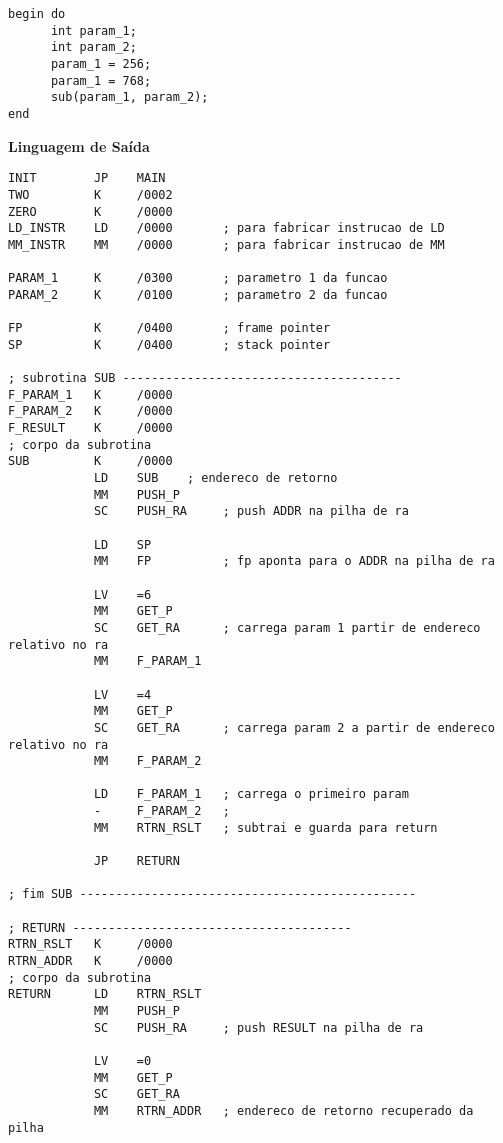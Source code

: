 \begin{lstlisting}
begin do
      int param_1;
      int param_2;
      param_1 = 256;
      param_1 = 768;
      sub(param_1, param_2);
end
\end{lstlisting}

\textbf{Linguagem de Saída}\\ 

\begin{lstlisting}
INIT        JP    MAIN
TWO         K     /0002
ZERO        K     /0000
LD_INSTR    LD    /0000       ; para fabricar instrucao de LD 
MM_INSTR    MM    /0000       ; para fabricar instrucao de MM

PARAM_1     K     /0300       ; parametro 1 da funcao
PARAM_2     K     /0100       ; parametro 2 da funcao

FP          K     /0400       ; frame pointer
SP          K     /0400       ; stack pointer

; subrotina SUB ---------------------------------------
F_PARAM_1   K     /0000
F_PARAM_2   K     /0000
F_RESULT    K     /0000
; corpo da subrotina
SUB         K     /0000
            LD    SUB    ; endereco de retorno
            MM    PUSH_P   
            SC    PUSH_RA     ; push ADDR na pilha de ra
            
            LD    SP
            MM    FP          ; fp aponta para o ADDR na pilha de ra

            LV    =6
            MM    GET_P       
            SC    GET_RA      ; carrega param 1 partir de endereco relativo no ra
            MM    F_PARAM_1
            
            LV    =4
            MM    GET_P       
            SC    GET_RA      ; carrega param 2 a partir de endereco relativo no ra
            MM    F_PARAM_2

            LD    F_PARAM_1   ; carrega o primeiro param
            -     F_PARAM_2   ; 
            MM    RTRN_RSLT   ; subtrai e guarda para return

            JP    RETURN

; fim SUB -----------------------------------------------

; RETURN ---------------------------------------
RTRN_RSLT   K     /0000
RTRN_ADDR   K     /0000
; corpo da subrotina
RETURN      LD    RTRN_RSLT
            MM    PUSH_P   
            SC    PUSH_RA     ; push RESULT na pilha de ra

            LV    =0
            MM    GET_P
            SC    GET_RA
            MM    RTRN_ADDR   ; endereco de retorno recuperado da pilha


\end{lstlisting}
